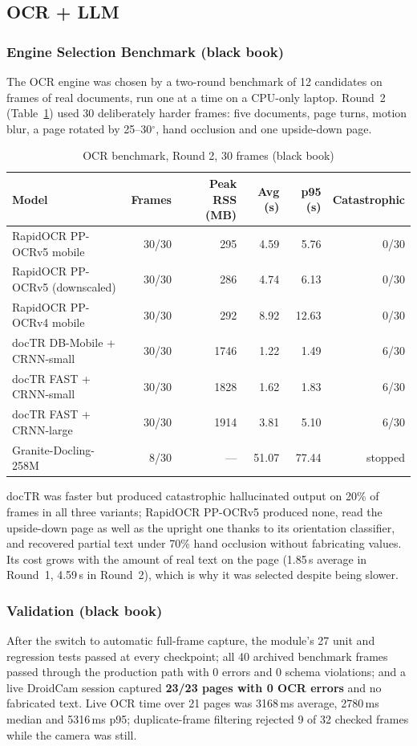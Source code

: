 \documentclass[12pt,singleside,a4paper]{article}
\begin{document}
\subsection{OCR + LLM}
\subsubsection{Engine Selection Benchmark (black book)}
The OCR engine was chosen by a two-round benchmark of 12 candidates on frames of real documents, run one at a time on a CPU-only laptop. Round~2 (Table~\ref{tab:ocrbench}) used 30 deliberately harder frames: five documents, page turns, motion blur, a page rotated by 25--30$^\circ$, hand occlusion and one upside-down page.

\begin{table}[H]
\centering
\caption{OCR benchmark, Round 2, 30 frames (black book)}
\label{tab:ocrbench}
\small
\begin{tabular}{@{}lrrrrr@{}}
\toprule
\textbf{Model} & \textbf{Frames} & \textbf{Peak RSS (MB)} & \textbf{Avg (s)} & \textbf{p95 (s)} & \textbf{Catastrophic} \\
\midrule
RapidOCR PP-OCRv5 mobile & 30/30 & 295 & 4.59 & 5.76 & 0/30 \\
RapidOCR PP-OCRv5 (downscaled) & 30/30 & 286 & 4.74 & 6.13 & 0/30 \\
RapidOCR PP-OCRv4 mobile & 30/30 & 292 & 8.92 & 12.63 & 0/30 \\
docTR DB-Mobile + CRNN-small & 30/30 & 1746 & 1.22 & 1.49 & 6/30 \\
docTR FAST + CRNN-small & 30/30 & 1828 & 1.62 & 1.83 & 6/30 \\
docTR FAST + CRNN-large & 30/30 & 1914 & 3.81 & 5.10 & 6/30 \\
Granite-Docling-258M & 8/30 & --- & 51.07 & 77.44 & stopped \\
\bottomrule
\end{tabular}
\end{table}

docTR was faster but produced catastrophic hallucinated output on 20\% of frames in all three variants; RapidOCR PP-OCRv5 produced none, read the upside-down page as well as the upright one thanks to its orientation classifier, and recovered partial text under 70\% hand occlusion without fabricating values. Its cost grows with the amount of real text on the page (1.85\,s average in Round~1, 4.59\,s in Round~2), which is why it was selected despite being slower.

\subsubsection{Validation (black book)}
After the switch to automatic full-frame capture, the module's 27 unit and regression tests passed at every checkpoint; all 40 archived benchmark frames passed through the production path with 0 errors and 0 schema violations; and a live DroidCam session captured \textbf{23/23 pages with 0 OCR errors} and no fabricated text. Live OCR time over 21 pages was 3168\,ms average, 2780\,ms median and 5316\,ms p95; duplicate-frame filtering rejected 9 of 32 checked frames while the camera was still.
\end{document}
